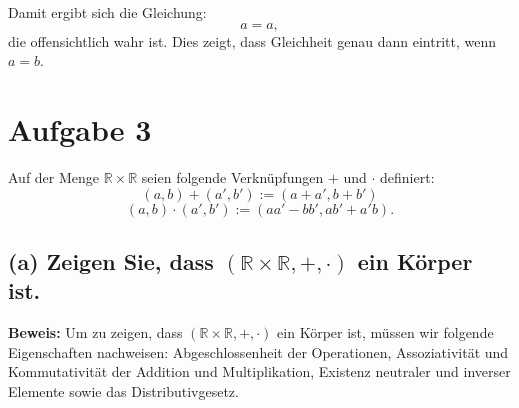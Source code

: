 \documentclass[11pt]{article}
\begin{document}
Damit ergibt sich die Gleichung:
\[
a = a,
\]
die offensichtlich wahr ist. Dies zeigt, dass Gleichheit genau dann eintritt, wenn \( a = b \).

   \section*{Aufgabe 3}

Auf der Menge \( \mathbb{R} \times \mathbb{R} \) seien folgende Verknüpfungen \( + \) und \( \cdot \) definiert:
\[
(a, b) + (a', b') := (a + a', b + b')
\]
\[
(a, b) \cdot (a', b') := (aa' - bb', ab' + a'b).
\]

\subsection*{(a) Zeigen Sie, dass \( (\mathbb{R} \times \mathbb{R}, +, \cdot) \) ein Körper ist.}

\textbf{Beweis:} Um zu zeigen, dass \( (\mathbb{R} \times \mathbb{R}, +, \cdot) \) ein Körper ist, müssen wir folgende Eigenschaften nachweisen: Abgeschlossenheit der Operationen, Assoziativität und Kommutativität der Addition und Multiplikation, Existenz neutraler und inverser Elemente sowie das Distributivgesetz.
\end{document}
